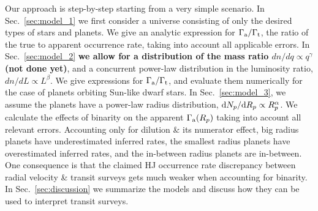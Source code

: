 \documentclass{emulateapj}
\begin{document}
Our approach is step-by-step starting from a very simple scenario.
In Sec.~\ref{sec:model_1} we first consider a universe consisting of only the 
desired types of stars and planets.  
We give an analytic expression for $\Gamma_{\rm a}/\Gamma_{\rm t}$, the ratio 
of the true to apparent occurrence rate, taking into account all applicable 
errors.
In Sec.~\ref{sec:model_2} {\bf we allow for a distribution of the mass ratio 
$dn/dq \propto q^\gamma$} {\bf (not done yet)}, 
and a concurrent power-law distribution in the luminosity ratio, $dn/dL 
\propto L^\beta$. 
We give expressions for $\Gamma_{\rm a}/\Gamma_{\rm t}$, and evaluate them 
numerically for the case of planets orbiting Sun-like dwarf stars.
In Sec.~\ref{sec:model_3}, 
we assume the planets have a power-law radius distribution, ${\rm 
d}N_p/{\rm d}R_p\propto R_p^\alpha$.  We calculate the 
effects of binarity on the apparent $\Gamma_{\rm a}(R_p)$ taking into account 
all relevant errors.
Accounting only for dilution \& its numerator effect, big radius planets have
underestimated inferred rates, the smallest radius planets have overestimated
inferred rates, and the in-between radius planets are in-between.
One consequence is that the claimed HJ occurrence rate discrepancy between 
radial velocity \& transit surveys gets much weaker when accounting for 
binarity.
In Sec.~\ref{sec:discussion} we summarize the models and discuss how they can 
be used to interpret transit surveys.
\end{document}
